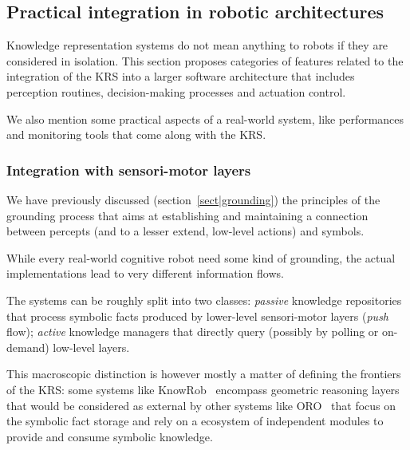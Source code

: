 \subsection{Practical integration in robotic architectures}
\label{sect|integration-robot}

\begin{scriptsize}
\begin{center}
\end{center}
\end{scriptsize}


Knowledge representation systems do not mean anything to robots if they are
considered in isolation. This section proposes categories of features related
to the integration of the KRS into a larger software architecture that includes
perception routines, decision-making processes and actuation control.

We also mention some practical aspects of a real-world system, like
performances and monitoring tools that come along with the KRS.

\subsubsection{Integration with sensori-motor layers}
\label{sect|integration-sensorimotor}

We have previously discussed (section~\ref{sect|grounding}) the principles of
the grounding process that aims at establishing and maintaining a connection
between percepts (and to a lesser extend, low-level actions) and symbols.

While every real-world cognitive robot need some kind of grounding, the actual
implementations lead to very different information flows.

The systems can be roughly split into two classes: \emph{passive} knowledge
repositories that process symbolic facts produced by lower-level sensori-motor
layers (\emph{push} flow); \emph{active} knowledge managers that directly query
(possibly by polling or on-demand) low-level layers.

This macroscopic distinction is however mostly a matter of defining the
frontiers of the KRS: some systems like KnowRob~\cite{Tenorth2009a} encompass
geometric reasoning layers that would be considered as external by other
systems like ORO~\cite{Lemaignan2010} that focus on the symbolic fact storage
and rely on a ecosystem of independent modules to provide and consume symbolic
knowledge.


